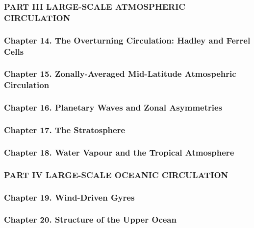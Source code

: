 \subsubsection{PART III LARGE-SCALE ATMOSPHERIC
CIRCULATION}\label{part-iii-large-scale-atmospheric-circulation}

\subsubsection{Chapter 14. The Overturning Circulation: Hadley and
Ferrel
Cells}\label{chapter-14.-the-overturning-circulation-hadley-and-ferrel-cells}

\subsubsection{Chapter 15. Zonally-Averaged Mid-Latitude Atmospehric
Circulation}\label{chapter-15.-zonally-averaged-mid-latitude-atmospehric-circulation}

\subsubsection{Chapter 16. Planetary Waves and Zonal
Asymmetries}\label{chapter-16.-planetary-waves-and-zonal-asymmetries}

\subsubsection{Chapter 17. The
Stratosphere}\label{chapter-17.-the-stratosphere}

\subsubsection{Chapter 18. Water Vapour and the Tropical
Atmosphere}\label{chapter-18.-water-vapour-and-the-tropical-atmosphere}

\subsubsection{PART IV LARGE-SCALE OCEANIC
CIRCULATION}\label{part-iv-large-scale-oceanic-circulation}

\subsubsection{Chapter 19. Wind-Driven
Gyres}\label{chapter-19.-wind-driven-gyres}

\subsubsection{Chapter 20. Structure of the Upper
Ocean}\label{chapter-20.-structure-of-the-upper-ocean}

